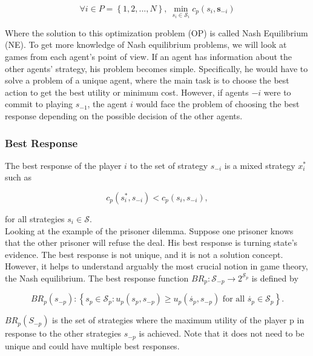 \begin{equation}
    \forall i \in P = \left\{ 1,2,..., N \right\}, \ \min_{s_i \in \mathcal{S}_i} c_p(s_i, \textbf{s}_{-i})
\end{equation}

Where the solution to this optimization problem (OP) is called Nash Equilibrium (NE). To get more knowledge of Nash equilibrium problems, we will look at games from each agent's point of view. If an agent has information about the other agents' strategy, his problem becomes simple. Specifically, he would have to solve a problem of a unique agent, where the main task is to choose the best action to get the best utility or minimum cost. However, if agents $-i$ were to commit to playing $s_{-1}$, the agent $i$ would face the problem of choosing the best response depending on the possible decision of the other agents.

\subsubsection{Best Response}

The best response of the player $i$ to the set of strategy $s_{-i}$ is a mixed strategy $x_i^{*}$ such as 

\begin{equation*}
c_p(s_i^*, s_{-i}) < c_p(s_i, s_{-i}),
\end{equation*}
 
for all strategies $ s_i \in \mathcal{S}$. \\

Looking at the example of the prisoner dilemma. Suppose one prisoner knows that the other prisoner will refuse the deal. His best response is turning state's evidence. The best response is not unique, and it is not a solution concept. However, it helps to understand arguably the most crucial notion in game theory, the Nash equilibrium.
The best response function $BR_p : \mathcal{S}_{-p} \to 2^{\mathcal{S}_p}$ is defined by 

\begin{equation*}
    BR_p(s_{-p}) : \left\{ s_p \in \mathcal{S}_{p} : u_p(s_{p},s_{-p}) \ge u_p(\acute{s_{p}},s_{-p}) \text{ for all } \acute{s_{p}} \in \mathcal{S}_{p} \right\} .
\end{equation*}

$BR_p(S_{-p})$ is the set of strategies where the maximum utility of the player p in response to the other strategies $s_{-p}$ is achieved. Note that it does not need to be unique and could have multiple best responses.


